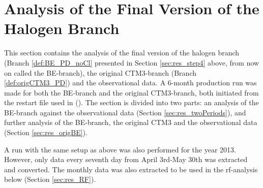 








\clearpage

\section{Analysis of the Final Version of the Halogen Branch}\label{sec:res_final_Version}

This section contains the analysis of the final version of the halogen branch (Branch \ref{def:BE_PD_noCl} presented in Section \ref{sec:res_step4} above, from now on called the BE-branch), the original CTM3-branch (Branch \ref{def:origCTM3_PD}) and the observational data. A 6-month production run was made for both the BE-branch and the original CTM3-branch, both initiated from the restart file used in  (\cite{Falk_2019}). The section is divided into two parts: an analysis of the BE-branch against the observational data (Section \ref{sec:res_twoPeriods}), and further analysis of the BE-branch, the original CTM3 and the observational data (Section \ref{sec:res_origBE}).

\medskip

A run with the same setup as above was also performed for the year 2013. However, only data every seventh day from April 3rd-May 30th was extracted and converted. The monthly data was also extracted to be used in the \acrlong{rf}-analysis below (Section \ref{sec:res_RF}). 


